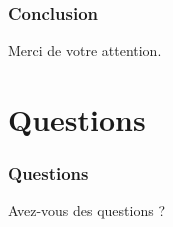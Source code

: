 \documentclass{beamer}
\begin{document}
\begin{frame}
    \frametitle{Conclusion}
    \begin{block}{}
        \centering
        Merci de votre attention.
    \end{block}
\end{frame}

\section*{Questions}

\begin{frame}
    \frametitle{Questions}
    \begin{block}{}
        \centering
        Avez-vous des questions ?
    \end{block}
\end{frame}
\end{document}
